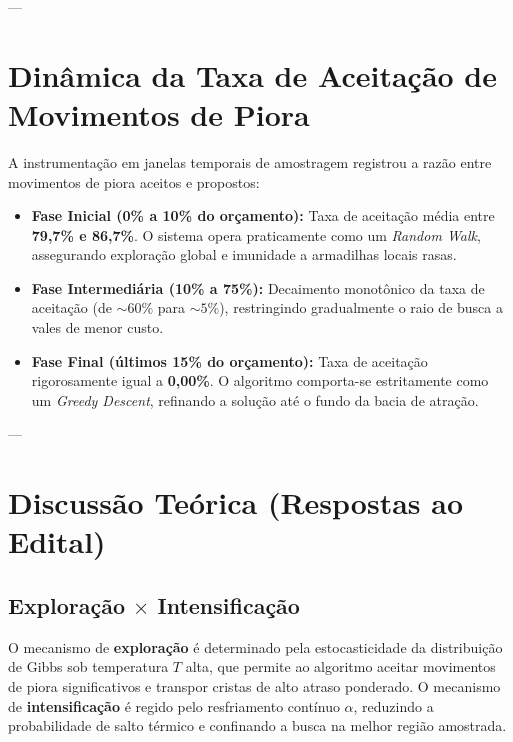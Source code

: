\documentclass[11pt,a4paper]{article}
\begin{document}
---

\section{Dinâmica da Taxa de Aceitação de Movimentos de Piora}

A instrumentação em janelas temporais de amostragem registrou a razão entre movimentos de piora aceitos e propostos:
\begin{itemize}
    \item \textbf{Fase Inicial (0\% a 10\% do orçamento):} Taxa de aceitação média entre \textbf{79,7\% e 86,7\%}. O sistema opera praticamente como um \textit{Random Walk}, assegurando exploração global e imunidade a armadilhas locais rasas.
    \item \textbf{Fase Intermediária (10\% a 75\%):} Decaimento monotônico da taxa de aceitação (de $\sim 60\%$ para $\sim 5\%$), restringindo gradualmente o raio de busca a vales de menor custo.
    \item \textbf{Fase Final (últimos 15\% do orçamento):} Taxa de aceitação rigorosamente igual a \textbf{0,00\%}. O algoritmo comporta-se estritamente como um \textit{Greedy Descent}, refinando a solução até o fundo da bacia de atração.
\end{itemize}

---

\section{Discussão Teórica (Respostas ao Edital)}

\subsection{Exploração $\times$ Intensificação}
O mecanismo de \textbf{exploração} é determinado pela estocasticidade da distribuição de Gibbs sob temperatura $T$ alta, que permite ao algoritmo aceitar movimentos de piora significativos e transpor cristas de alto atraso ponderado. O mecanismo de \textbf{intensificação} é regido pelo resfriamento contínuo $\alpha$, reduzindo a probabilidade de salto térmico e confinando a busca na melhor região amostrada.
\end{document}
